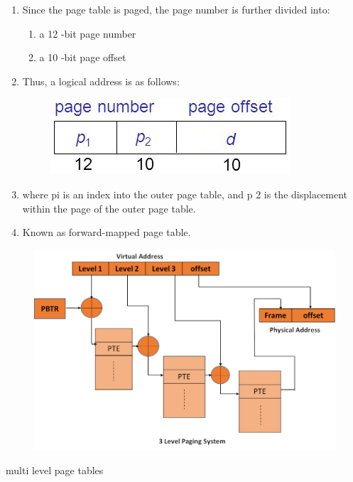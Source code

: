 \begin{enumerate}
\begin{enumerate}
      \item Since the page table is paged, the page number is further divided into:
      \begin{enumerate}
          \item a 12 -bit page number
          \item a 10 -bit page offset
      \end{enumerate}

      \item Thus, a logical address is as follows: \\
      \begin{figure}[h]
          \centering   \includegraphics[scale=2.5]{./images/paging_02.jpeg}
      \end{figure}
      \item where pi is an index into the outer page table, and p 2 is the displacement within the page of the outer page table.
      \item Known as forward-mapped page table.

    \end{enumerate}


      \begin{figure}[h]
          \centering   \includegraphics[scale=0.4]{./images/paging_03.jpeg}
      \end{figure}

    \begin{minipage}{\linewidth}
    \item multi level page tables \\


\end{minipage}
\end{enumerate}
